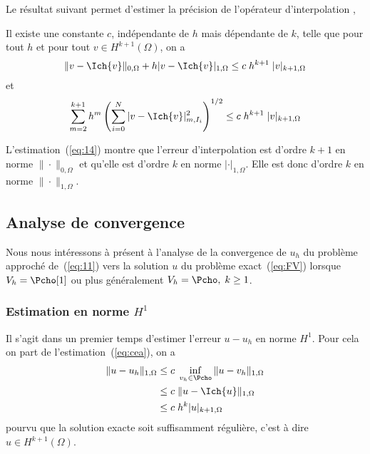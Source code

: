 Le résultat suivant permet d'estimer la précision de l'opérateur
d'interpolation \Ich,
\begin{proposition}
  \label{prop:2}
  Il existe une constante $c$, indépendante de $h$ mais dépendante de $k$,
  telle que pour tout $h$ et pour tout $v \in H^{k+1}(\Omega)$, on a
  \begin{equation}
    \label{eq:14}
    \|v - \Ich{v}\|_{0,\Omega} + h |v - \Ich{v}|_{1,\Omega}  \leq c\; h^{k+1}\; |v|_{k+1,\Omega}
  \end{equation}
  et
  \begin{equation}
    \label{eq:15}
    \sum_{m=2}^{k+1} h^m \left( \sum_{i=0}^N |v - \Ich{v}|^2_{m,I_i}\right)^{1/2}  \leq c\; h^{k+1}\; |v|_{k+1,\Omega}
  \end{equation}
\end{proposition}
\begin{remark}
  \label{rem:4}
  L'estimation~(\ref{eq:14}) montre que l'erreur d'interpolation est d'ordre
  $k+1$ en norme $\|\cdot\|_{0,\Omega}$ et qu'elle est d'ordre $k$ en norme
  $|\cdot|_{1,\Omega}$. Elle est donc d'ordre $k$ en norme
  $\|\cdot\|_{1,\Omega}$.
\end{remark}

\subsection{Analyse de convergence}
\label{sec:analyse-de-conv}

Nous nous intéressons à présent à l'analyse de la convergence de $u_h$ du
problème approché de~(\ref{eq:11}) vers la solution $u$ du problème
exact~(\ref{eq:FV}) lorsque $V_h=\Pcho[1]$ ou plus généralement $V_h=\Pcho,\;
k\geq 1$.

\subsubsection{Estimation en norme $H^1$}
\label{sec:estimation-en-norm}

Il s'agit dans un premier temps d'estimer l'erreur $u-u_h$ en norme
$H^1$. Pour cela on part de l'estimation~(\ref{eq:cea}), on a
\begin{equation}
  \label{eq:12}
  \begin{split}
    \|u-u_h\|_{1,\Omega} &\leq c\; \inf_{v_h \in \Pcho} \|u-v_h\|_{1,\Omega}\\
    & \leq c\;  \|u-\Ich{u}\|_{1,\Omega}\\
    & \leq c\; h^k |u|_{k+1,\Omega}
  \end{split}
\end{equation}
pourvu que la solution exacte soit suffisamment régulière, c'est à dire $u \in
H^{k+1}(\Omega)$.

